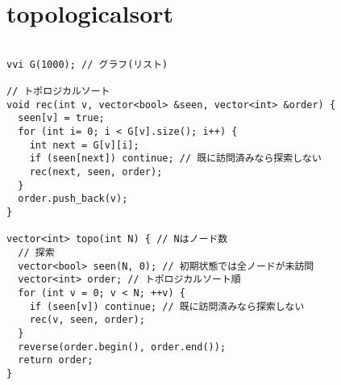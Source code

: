 \documentclass[a4j,titlepage]{jarticle} %
\begin{document}
\color{white}
\section{topologicalsort}
\color{black}
\begin{lstlisting}[caption=topologicalsort]

vvi G(1000); // グラフ(リスト)

// トポロジカルソート
void rec(int v, vector<bool> &seen, vector<int> &order) {
  seen[v] = true;
  for (int i= 0; i < G[v].size(); i++) {
    int next = G[v][i];
    if (seen[next]) continue; // 既に訪問済みなら探索しない
    rec(next, seen, order);
  }
  order.push_back(v);
}

vector<int> topo(int N) { // Nはノード数
  // 探索
  vector<bool> seen(N, 0); // 初期状態では全ノードが未訪問
  vector<int> order; // トポロジカルソート順
  for (int v = 0; v < N; ++v) {
    if (seen[v]) continue; // 既に訪問済みなら探索しない
    rec(v, seen, order);
  }
  reverse(order.begin(), order.end());
  return order;
}

\end{lstlisting}

\color{white}
\end{document}
